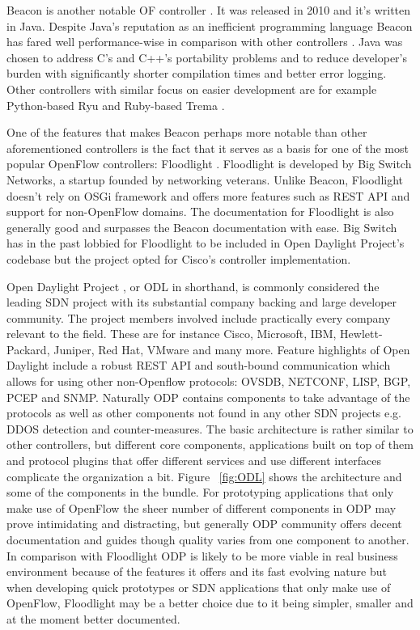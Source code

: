 	Beacon is another notable OF controller \cite{Beacon}. It was released in 2010 and it’s written in Java. Despite Java’s reputation as an inefficient programming language Beacon has fared well performance-wise in comparison with other controllers \cite{Erickson13}. Java was chosen to address C’s and C++’s portability problems and to reduce developer’s burden with significantly shorter compilation times and better error logging. Other controllers with similar focus on easier development are for example Python-based Ryu \cite{Ryu} and Ruby-based Trema \cite{Trema}.

One of the features that makes Beacon perhaps more notable than other aforementioned controllers is the fact that it serves as a basis for one of the most popular OpenFlow controllers: Floodlight \cite{Floodlight}. Floodlight is developed by Big Switch Networks, a startup founded by networking veterans. Unlike Beacon, Floodlight doesn’t rely on OSGi framework and offers more features such as REST API and support for non-OpenFlow domains. The documentation for Floodlight is also generally good and surpasses the Beacon documentation with ease.
 Big Switch has in the past lobbied for Floodlight to be included in Open Daylight Project’s codebase \cite{BAN13} but the project opted for Cisco’s controller implementation. 

Open Daylight Project \cite{ODL}, or ODL in shorthand, is commonly considered the leading SDN project with its substantial company backing and large developer community. The project members involved include practically every company relevant to the field. These are for instance Cisco, Microsoft, IBM, Hewlett-Packard, Juniper, Red Hat, VMware and many more. Feature highlights of Open Daylight include  a robust REST API and south-bound communication which allows for using other non-Openflow protocols: OVSDB, NETCONF, LISP, BGP, PCEP and SNMP. Naturally ODP contains components to take advantage of the protocols as well as other components not found in any other SDN projects e.g. DDOS detection and counter-measures. The basic architecture is rather similar to other controllers, but different core components, applications built on top of them and protocol plugins that offer different services and use different interfaces complicate the organization a bit. Figure ~\ref{fig:ODL} shows the architecture and some of the components in the bundle. For prototyping applications that only make use of OpenFlow the sheer number of different components in ODP may prove intimidating and distracting, but generally ODP community offers decent documentation and guides though quality varies from one component to another. In comparison with Floodlight ODP is likely to be more viable in real business environment because of the features it offers and its fast evolving nature but when developing quick prototypes or SDN applications that only make use of OpenFlow, Floodlight may be a better choice due to it being simpler, smaller and at the moment better documented.

